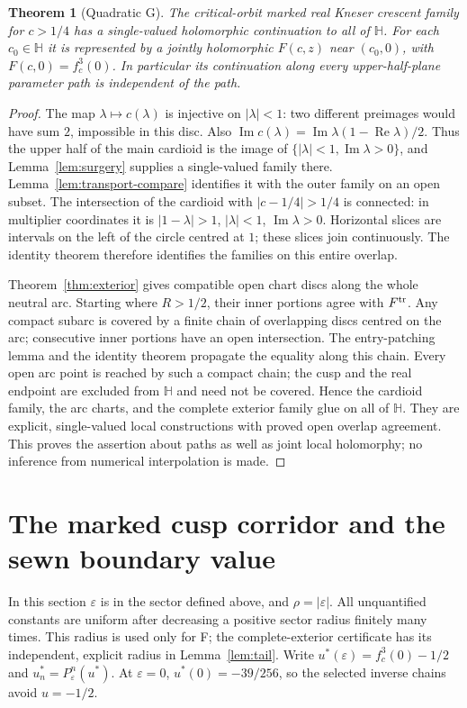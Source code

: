 \documentclass[11pt]{article}
\newtheorem{theorem}{Theorem}
\newcommand{\HH}{\mathbb H}
\newcommand{\re}{\operatorname{Re}}
\newcommand{\im}{\operatorname{Im}}
\begin{document}
\begin{theorem}[Quadratic G]\label{thm:G}
The critical-orbit marked real Kneser crescent family for $c>1/4$
has a single-valued holomorphic continuation to all of $\HH$.
For each $c_0\in\HH$ it is represented by a jointly holomorphic
$F(c,z)$ near $(c_0,0)$, with $F(c,0)=f_c^3(0)$. In particular its
continuation along every upper-half-plane parameter path is independent
of the path.
\end{theorem}
\begin{proof}
The map $\lambda\mapsto c(\lambda)$ is injective on $|\lambda|<1$:
two different preimages would have sum $2$, impossible in this disc.
Also $\im c(\lambda)=\im\lambda(1-\re\lambda)/2$.
Thus the upper half of the main cardioid is the image of
$\{|\lambda|<1,\im\lambda>0\}$, and
Lemma~\ref{lem:surgery} supplies a single-valued family there.
Lemma~\ref{lem:transport-compare} identifies it with the outer family
on an open subset. The intersection of the cardioid with
$|c-1/4|>1/4$ is connected: in multiplier coordinates it is
$|1-\lambda|>1$, $|\lambda|<1$, $\im\lambda>0$.
Horizontal slices are intervals on the left of the circle centred at
$1$; these slices join continuously. The identity theorem therefore
identifies the families on this entire overlap.

Theorem~\ref{thm:exterior} gives compatible open chart discs along the
whole neutral arc. Starting where $R>1/2$, their inner portions agree
with $F^{\rm tr}$. Any compact subarc is covered by a finite chain of
overlapping discs centred on the arc; consecutive inner portions have
an open intersection. The entry-patching lemma and the identity theorem
propagate the equality along this chain. Every open arc point is reached
by such a compact chain; the cusp and the real endpoint are excluded
from $\HH$ and need not be covered. Hence the cardioid family, the arc
charts, and the complete exterior family glue on all of $\HH$.
They are explicit, single-valued local constructions with proved open
overlap agreement. This proves the assertion about paths as well as
joint local holomorphy; no inference from numerical interpolation is
made.
\end{proof}

\section{The marked cusp corridor and the sewn boundary value}
In this section $\varepsilon$ is in the sector defined above, and
$\rho=|\varepsilon|$. All unquantified constants are uniform after
decreasing a positive sector radius finitely many times. This radius is
used only for F; the complete-exterior certificate has its independent,
explicit radius in Lemma~\ref{lem:tail}.
Write $u^*(\varepsilon)=f_c^3(0)-1/2$ and
$u_n^*=P_\varepsilon^n(u^*)$. At $\varepsilon=0$,
$u^*(0)=-39/256$, so the selected inverse chains avoid $u=-1/2$.
\end{document}
